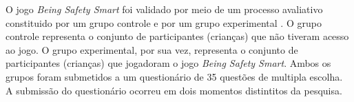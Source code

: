 O jogo \textit{Being Safety Smart} foi validado por meio de um processo avaliativo constituido por um grupo controle e por um grupo experimental \cite{jones2010being}. O grupo controle representa o conjunto de participantes (crianças) que não tiveram acesso ao jogo. O grupo experimental, por sua vez, representa o conjunto de participantes (crianças) que jogadoram o jogo \textit{Being Safety Smart}. Ambos os grupos foram submetidos a um questionário de 35 questões de multipla escolha. A submissão do questionário ocorreu em dois momentos distintitos da pesquisa. 

